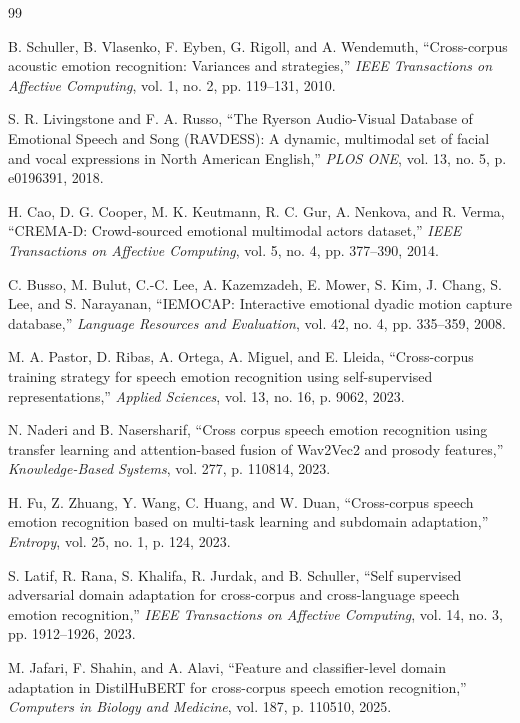 \documentclass[9pt,twocolumn,letterpaper]{article}
\begin{document}
\begin{thebibliography}{99}

B. Schuller, B. Vlasenko, F. Eyben, G. Rigoll, and A. Wendemuth,
``Cross-corpus acoustic emotion recognition: Variances and strategies,''
\textit{IEEE Transactions on Affective Computing}, vol. 1, no. 2, pp. 119--131, 2010.

S. R. Livingstone and F. A. Russo,
``The Ryerson Audio-Visual Database of Emotional Speech and Song (RAVDESS): A dynamic, multimodal set of facial and vocal expressions in North American English,''
\textit{PLOS ONE}, vol. 13, no. 5, p. e0196391, 2018.

H. Cao, D. G. Cooper, M. K. Keutmann, R. C. Gur, A. Nenkova, and R. Verma,
``CREMA-D: Crowd-sourced emotional multimodal actors dataset,''
\textit{IEEE Transactions on Affective Computing}, vol. 5, no. 4, pp. 377--390, 2014.

C. Busso, M. Bulut, C.-C. Lee, A. Kazemzadeh, E. Mower, S. Kim, J. Chang, S. Lee, and S. Narayanan,
``IEMOCAP: Interactive emotional dyadic motion capture database,''
\textit{Language Resources and Evaluation}, vol. 42, no. 4, pp. 335--359, 2008.

M. A. Pastor, D. Ribas, A. Ortega, A. Miguel, and E. Lleida,
``Cross-corpus training strategy for speech emotion recognition using self-supervised representations,''
\textit{Applied Sciences}, vol. 13, no. 16, p. 9062, 2023.

N. Naderi and B. Nasersharif,
``Cross corpus speech emotion recognition using transfer learning and attention-based fusion of Wav2Vec2 and prosody features,''
\textit{Knowledge-Based Systems}, vol. 277, p. 110814, 2023.

H. Fu, Z. Zhuang, Y. Wang, C. Huang, and W. Duan,
``Cross-corpus speech emotion recognition based on multi-task learning and subdomain adaptation,''
\textit{Entropy}, vol. 25, no. 1, p. 124, 2023.

S. Latif, R. Rana, S. Khalifa, R. Jurdak, and B. Schuller,
``Self supervised adversarial domain adaptation for cross-corpus and cross-language speech emotion recognition,''
\textit{IEEE Transactions on Affective Computing}, vol. 14, no. 3, pp. 1912--1926, 2023.

M. Jafari, F. Shahin, and A. Alavi,
``Feature and classifier-level domain adaptation in DistilHuBERT for cross-corpus speech emotion recognition,''
\textit{Computers in Biology and Medicine}, vol. 187, p. 110510, 2025.


\end{thebibliography}
\end{document}
